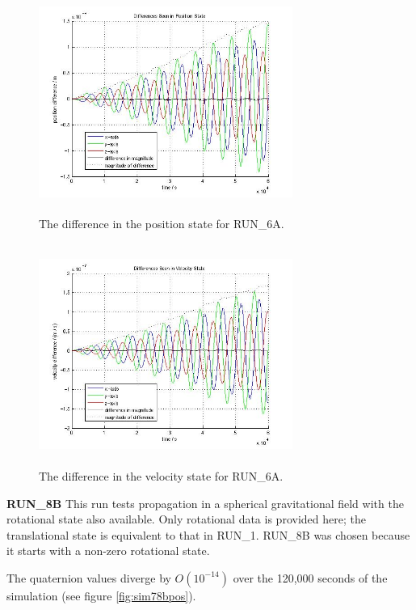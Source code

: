 \begin{description}
\begin{figure}[htp]
\begin{center}
\includegraphics[width=3.2736in,height=2.85in]{figures/run6apos.jpg}
\caption{The difference in the position state for RUN\_6A.}
\label{fig:sim76apos}
\end{center}
\end{figure}

\begin{figure}[htp]
\begin{center}
\includegraphics[width=3.2736in,height=2.85in]{figures/run6avel.jpg}
\caption{The difference in the velocity state for RUN\_6A.}
\label{fig:sim76avel}
\end{center}
\end{figure}

\clearpage
{\bf RUN\_8B}
This run tests propagation in a spherical gravitational field with the 
rotational state also available.  Only rotational data is provided here; the 
translational state is equivalent to that in RUN\_1.  RUN\_8B was chosen 
because it starts with a non-zero rotational state.

The quaternion values diverge by $O(10^{-14})$ over the 120,000 seconds of the 
simulation (see figure \ref{fig:sim78bpos}).


\end{description}
